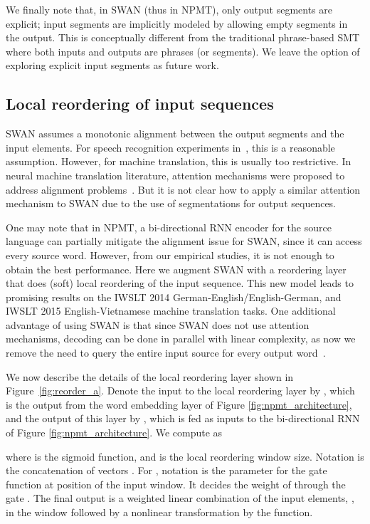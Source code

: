 \documentclass{article}
\begin{document}
We finally note that, in SWAN (thus in NPMT), only output segments are explicit;
input segments are implicitly modeled by allowing empty segments in the
output.  This is conceptually different from the traditional phrase-based SMT
where both inputs and outputs are phrases (or segments). We leave the option of
exploring explicit input segments as future work.

\subsection{Local reordering of input sequences}
\label{sec:reorder}

SWAN assumes a monotonic alignment between the output segments and the input
elements. For speech recognition experiments in~\citet{wang2017sequence}, this
is a reasonable assumption. However, for machine translation, this is usually too
restrictive.  In neural machine translation literature, attention mechanisms were
proposed to address alignment
problems~\citep{Bahdanau:2014,luong2015effective,raffel2017online,vaswani2017attention}.
But it is not clear how to apply a similar attention mechanism to SWAN due to
the use of segmentations for output sequences.

One may note that in NPMT, a bi-directional RNN encoder for the
source language can partially mitigate the alignment issue for SWAN, since it can access
every source word. However, from our empirical studies, it is not enough to obtain the best
performance.  
Here we augment SWAN with a reordering layer that does (soft) local 
reordering of the input sequence.  
This new model leads to promising
results on the IWSLT 2014 German-English/English-German, and IWSLT 2015
English-Vietnamese machine translation tasks. One additional advantage of using
SWAN is that since SWAN does not use attention mechanisms, decoding can be done in parallel with linear complexity, as now we remove the need to query the entire input source for every output
word~\citep{raffel2017online, gu2018non-autoregressive}.

We now describe the details of the local reordering layer shown in
Figure~\ref{fig:reorder_a}. Denote the input to the local reordering layer by
, which is the output from the word embedding layer of Figure \ref{fig:npmt_architecture}, 
and the output of this layer by , which is fed as inputs to the bi-directional RNN of Figure \ref{fig:npmt_architecture}.
We compute  as

where  is the sigmoid function, and  is the local
reordering window size. Notation 
is the concatenation of vectors .
For , notation  is the parameter for the gate function at
position  of the input window. It decides the weight of 
through the gate . The final output  is a weighted linear combination of
the input elements, , in the window
followed by a nonlinear transformation by the  function.
\end{document}
